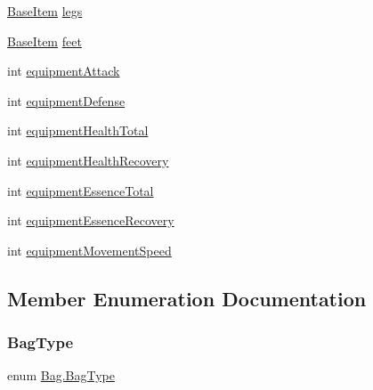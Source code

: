 \begin{DoxyCompactItemize}
\mbox{\hyperlink{class_base_item}{Base\+Item}} \mbox{\hyperlink{class_bag_a06fc81d3974eb764db9be3fda8e63284}{legs}}
\item 
\mbox{\hyperlink{class_base_item}{Base\+Item}} \mbox{\hyperlink{class_bag_a45172ef71e457ce9c818866fc0ffd5c2}{feet}}
\item 
int \mbox{\hyperlink{class_bag_a009c51f2adf7e0dbddd0bcc97fee8708}{equipment\+Attack}}
\item 
int \mbox{\hyperlink{class_bag_ade9d98eb07c941f15f1bf40eaa67523f}{equipment\+Defense}}
\item 
int \mbox{\hyperlink{class_bag_a27e5f9ef8f024e1d1cf5d321cb28836c}{equipment\+Health\+Total}}
\item 
int \mbox{\hyperlink{class_bag_a38d2f92304d56781de31a7098695ac72}{equipment\+Health\+Recovery}}
\item 
int \mbox{\hyperlink{class_bag_a623cd2a1f6198424405ad8066ca6025e}{equipment\+Essence\+Total}}
\item 
int \mbox{\hyperlink{class_bag_a79e24ed265181b438682a9fbc6cc37a6}{equipment\+Essence\+Recovery}}
\item 
int \mbox{\hyperlink{class_bag_ad551aa1b82517235b92383220f44ed4c}{equipment\+Movement\+Speed}}
\end{DoxyCompactItemize}


\subsection{Member Enumeration Documentation}
\mbox{\label{class_bag_a5a827c44705d57202edc93b9a39316c7}} 
\subsubsection{\texorpdfstring{BagType}{BagType}}
{\footnotesize\ttfamily enum \mbox{\hyperlink{class_bag_a5a827c44705d57202edc93b9a39316c7}{Bag.\+Bag\+Type}}\hspace{0.3cm}{\ttfamily [strong]}}


